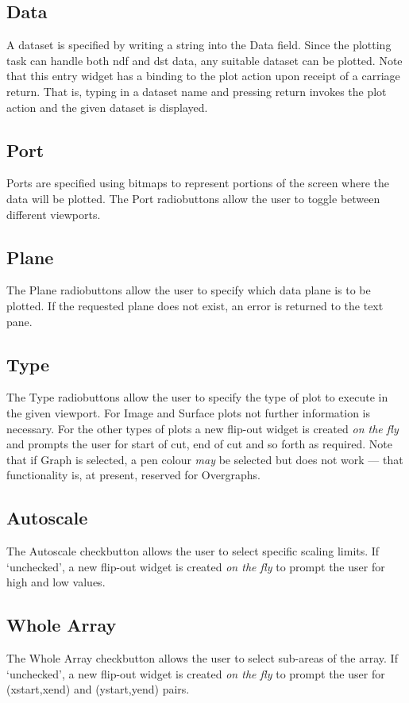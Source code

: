 \documentclass[a4paper]{book}
\renewcommand{\_}{{\tt\char'137}}
\begin{document}
\subsection{Data}
A dataset is specified by writing a string into the {\sf Data} field. Since
the plotting task can handle both {\sc ndf} and {\sc dst} data, any suitable
dataset can be plotted. Note that this entry widget has a binding to the plot
action upon receipt of a carriage return. That is, typing in a dataset name
and pressing {\sc return} invokes the plot action and the given dataset is
displayed.

\subsection{Port}
Ports are specified using bitmaps to represent portions of the screen 
where the data will be plotted. 
The {\sf Port} radiobuttons allow the user to toggle between different viewports.

\subsection{Plane}
The {\sf Plane} radiobuttons allow the user to specify which data plane is to be
plotted. If the requested plane does not exist, an error is returned to the text pane.

\subsection{Type}
The {\sf Type} radiobuttons allow the user to specify the type of plot to execute
in the given viewport. For {\sf Image} and {\sf Surface} plots not further information
is necessary. For the other types of plots a new flip-out widget is created {\em on the
fly} and prompts the user for start of cut, end of cut and so forth as required. Note that if
{\sf Graph} is selected, a pen colour {\em may} be selected but does not work --- that 
functionality is, at present, reserved for {\sf Overgraphs}.

\subsection{Autoscale}
The {\sf Autoscale} checkbutton allows the user to select specific scaling limits.
If `unchecked', a new flip-out widget is created {\em on the fly} to prompt the user for
high and low values. 

\subsection{Whole Array}
The {\sf Whole Array} checkbutton allows the user to select sub-areas of the array.
If `unchecked', a new flip-out widget is created {\em on the fly} to prompt the user for
(xstart,xend) and (ystart,yend) pairs.
\end{document}

